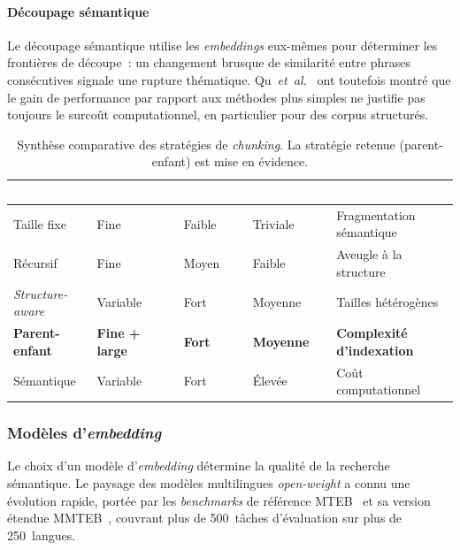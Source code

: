 \documentclass[11pt,a4paper]{article}
\begin{document}
\paragraph{Découpage sémantique}

Le découpage sémantique utilise les \textit{embeddings} eux-mêmes pour déterminer les frontières de découpe~: un changement brusque de similarité entre phrases consécutives signale une rupture thématique. Qu~\textit{et~al.}~\cite{qu2025semantic} ont toutefois montré que le gain de performance par rapport aux méthodes plus simples ne justifie pas toujours le surcoût computationnel, en particulier pour des corpus structurés.

\begin{table}[H]
\centering
\small
\begin{tabularx}{\linewidth}{L{2.8cm} C{2cm} C{2.2cm} C{2.2cm} L{3cm}}
\toprule
{}
\textcolor{white}{\textbf{Stratégie}} &
\textcolor{white}{\textbf{Granularité}} &
\textcolor{white}{\textbf{Contexte}} &
\textcolor{white}{\textbf{Complexité}} &
\textcolor{white}{\textbf{Limite principale}} \\
\midrule
Taille fixe          & Fine     & Faible    & Triviale    & Fragmentation sémantique \\
Récursif             & Fine     & Moyen     & Faible      & Aveugle à la structure \\
\textit{Structure-aware} & Variable & Fort  & Moyenne     & Tailles hétérogènes \\
\textbf{Parent-enfant} & \textbf{Fine + large} & \textbf{Fort} & \textbf{Moyenne} & \textbf{Complexité d'indexation} \\
Sémantique           & Variable & Fort      & Élevée      & Coût computationnel \\
\bottomrule
\end{tabularx}
\caption{Synthèse comparative des stratégies de \textit{chunking}. La stratégie retenue (parent-enfant) est mise en évidence.}
\label{tab:chunking}
\end{table}

\subsubsection{Modèles d'\textit{embedding}}

Le choix d'un modèle d'\textit{embedding} détermine la qualité de la recherche sémantique. Le paysage des modèles multilingues \textit{open-weight} a connu une évolution rapide, portée par les \textit{benchmarks} de référence MTEB~\cite{muennighoff2023mteb} et sa version étendue MMTEB~\cite{enevoldsen2025mmteb}, couvrant plus de 500~tâches d'évaluation sur plus de 250~langues.
\end{document}
